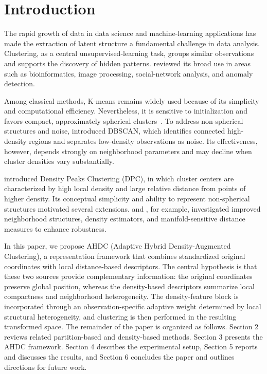 \documentclass[twoside]{article}
\begin{document}
\section{Introduction}
The rapid growth of data in data science and machine-learning applications has made the extraction of latent structure a fundamental challenge in data analysis. Clustering, as a central unsupervised-learning task, groups similar observations and supports the discovery of hidden patterns. \cite{XuWunsch2005} reviewed its broad use in areas such as bioinformatics, image processing, social-network analysis, and anomaly detection.

Among classical methods, K-means remains widely used because of its simplicity and computational efficiency. Nevertheless, it is sensitive to initialization and favors compact, approximately spherical clusters~\cite{Jain2010}. To address non-spherical structures and noise, \cite{Ester1996} introduced DBSCAN, which identifies connected high-density regions and separates low-density observations as noise. Its effectiveness, however, depends strongly on neighborhood parameters and may decline when cluster densities vary substantially.

\cite{Rodriguez2014} introduced Density Peaks Clustering (DPC), in which cluster centers are characterized by high local density and large relative distance from points of higher density. Its conceptual simplicity and ability to represent non-spherical structures motivated several extensions. \cite{Du2016} and \cite{Wang2025}, for example, investigated improved neighborhood structures, density estimators, and manifold-sensitive distance measures to enhance robustness.

In this paper, we propose AHDC (Adaptive Hybrid Density-Augmented Clustering), a representation framework that combines standardized original coordinates with local distance-based descriptors. The central hypothesis is that these two sources provide complementary information: the original coordinates preserve global position, whereas the density-based descriptors summarize local compactness and neighborhood heterogeneity. The density-feature block is incorporated through an observation-specific adaptive weight determined by local structural heterogeneity, and clustering is then performed in the resulting transformed space. The remainder of the paper is organized as follows. Section 2 reviews related partition-based and density-based methods. Section 3 presents the AHDC framework. Section 4 describes the experimental setup, Section 5 reports and discusses the results, and Section 6 concludes the paper and outlines directions for future work.
\end{document}
